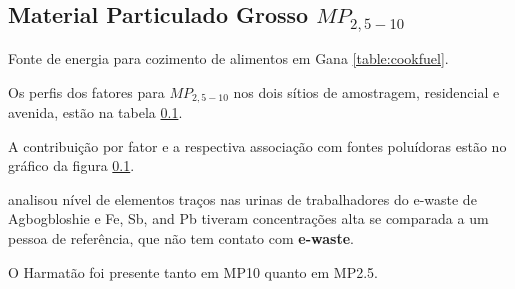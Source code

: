 \subsection{Material Particulado Grosso $MP_{2,5-10}$}

Fonte de energia para cozimento de alimentos em Gana \ref{table:cookfuel}.
\begin{table}[H]
 \centering
  
  \caption{Fontes de energia usadas para cozimento de alimentos em 
           Gana \citep{ghanacensus2013} \label{table:cookfuel}}
\end{table}

Os perfis dos fatores para $MP_{2,5-10}$ nos dois sítios de amostragem, 
residencial e avenida, estão na tabela \ref{}.

A contribuição por fator e a respectiva associação com fontes poluídoras
estão no gráfico da figura \ref{}. 

\citep{asante2012} analisou nível de elementos traços nas urinas de trabalhadores 
do e-waste de Agbogbloshie e Fe, Sb, and Pb tiveram concentrações alta se comparada
a um pessoa de referência, que não tem contato com \textbf{e-waste}.

O Harmatão foi presente tanto em MP10 quanto em MP2.5.

\begin{table}[H]
  
  \caption{Análise de Fatores para $MP_{2,5-10}$ na área residencial
           excluindo-se dias de ocorrência do Harmatão.
           Rotação varimax - 5 fatores retidos (n=).
           (\textcolor{red}{h} : Comunalidade; 
           \textcolor{red}{S=1-h} : Singularidade; 
           \textcolor{red}{C} : Complexidade.)
           \label{table:loadings_RGsH4}}
\end{table}

\begin{table}[H]
  
  \caption{Análise de Fatores para $MP_{2,5-10}$ na avenida
           excluindo-se dias de ocorrência do Harmatão.
           Rotação varimax - 5 fatores retidos (n=).
           (\textcolor{red}{h} : Comunalidade; 
           \textcolor{red}{S=1-h} : Singularidade; 
           \textcolor{red}{C} : Complexidade.)
           \label{table:loadings_TGsH4}}
\end{table}

\begin{table}[H]
  \centering
    
    \caption{residencial $MP_{2,5-10}$ removendo-se os dias do Harmatão 
              seed=123; n=. 
             \label{table:RGsH_profiles4}}
\end{table}

